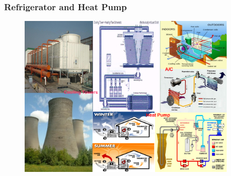 \documentclass[10pt,compress]{beamer}
\begin{document}
\begin{frame}
\begin{columns}
\begin{column}[c]{0.55\linewidth}
\begin{figure}
\begin{center}
     \end{center}
    \end{figure}
   \end{column}  
  \end{columns}
\end{frame}

\begin{frame}
 \frametitle{Refrigerator and Heat Pump}
    \begin{figure}%
     \begin{center}
      \includegraphics[width=12.cm,height=7.8cm]{./Pics/Overview_Refrig3}
     \end{center}
    \end{figure}
\end{frame}



\end{document}
